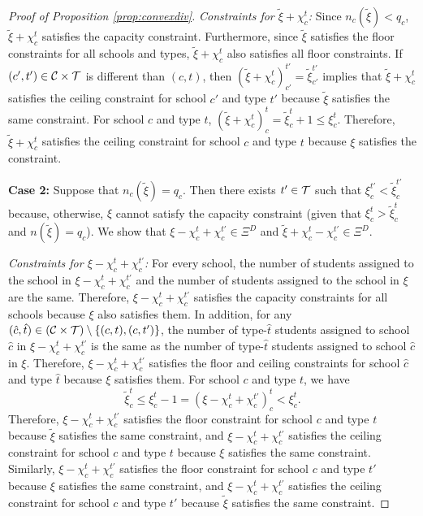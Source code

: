 \documentclass[12pt]{amsart}
\theoremstyle{remark}
\begin{document}
\begin{proof}[Proof of Proposition \ref{prop:convexdiv}]
\smallskip
\noindent \emph{Constraints for $\tilde \xi + \chi_c^t$:} Since $n_c(\tilde \xi) < q_c$, $\tilde \xi + \chi_c^t$ satisfies the capacity constraint.
Furthermore, since $\tilde \xi$ satisfies the floor constraints for all schools and types,  $\tilde \xi + \chi_c^t$ also satisfies all
floor constraints. If $(c',t')\in \mathcal{C} \times \mathcal{T}$ is different than $(c,t)$, then $(\tilde \xi + \chi_c^t)_{c'}^{t'}=\tilde{\xi}_{c'}^{t'}$
implies that $\tilde \xi + \chi_c^t$ satisfies the ceiling constraint for school $c'$ and type $t'$ because $\tilde \xi$ satisfies the same
constraint. For school $c$ and type $t$, $(\tilde \xi + \chi_c^t)_{c}^{t}= \tilde{\xi}_c^t + 1 \leq \xi_c^t$. Therefore, $\tilde \xi + \chi_c^t$
satisfies the ceiling constraint for school $c$ and type $t$ because $\xi$ satisfies the constraint.

\medskip
\textbf{Case 2:} Suppose that $n_c(\tilde \xi) = q_c$. Then there exists $t'\in \mathcal{T}$ such that $\xi_c^{t'} < \tilde{\xi}_{c}^{t'}$ because,
otherwise, $\xi$ cannot satisfy the capacity constraint (given that $\xi_c^t>\tilde{\xi}_{c}^{t}$ and $n(\tilde \xi) = q_c$). We show that
$\xi-\chi_c^t+\chi_{c}^{t'} \in \Xi^D$ and $\tilde{\xi}+\chi_c^t-\chi_{c}^{t'}\in \Xi^D$.

\smallskip
\noindent \emph{Constraints for $\xi-\chi_c^t+\chi_{c}^{t'}$:} For every school, the number of students assigned to the school in $\xi-\chi_c^t+\chi_{c}^{t'}$ and
the number of students assigned to the school in $\xi$ are the same. Therefore, $\xi-\chi_c^t+\chi_{c}^{t'}$ satisfies the capacity constraints for all schools
because $\xi$ also satisfies them. In addition, for any $(\hat c, \hat t) \in (\mathcal{C} \times \mathcal{T}) \setminus \{(c,t),(c,t')\}$, the
number of type-$\hat{t}$ students assigned to school $\hat c$ in $\xi-\chi_c^t+\chi_{c}^{t'}$ is the same as the
number of type-$\hat{t}$ students assigned to school $\hat c$ in $\xi$. Therefore, $\xi-\chi_c^t+\chi_{c}^{t'}$ satisfies the floor
and ceiling constraints for school $\hat c$ and type $\hat t$ because $\xi$ satisfies them. For school $c$ and type $t$, we have
\[\tilde{\xi}^t_c \leq \xi^t_c-1=(\xi-\chi_c^t+\chi_{c}^{t'})_c^t<\xi^t_c.\]
Therefore, $\xi-\chi_c^t+\chi_{c}^{t'}$ satisfies the floor constraint for school $c$ and type $t$ because $\tilde \xi$ satisfies the same constraint, and $\xi-\chi_c^t+\chi_{c}^{t'}$ satisfies the ceiling constraint for school $c$ and type $t$ because $\xi$ satisfies the same constraint. Similarly,  $\xi-\chi_c^t+\chi_{c}^{t'}$ satisfies the floor constraint for school $c$ and type $t'$ because $ \xi$ satisfies the same constraint, and $\xi-\chi_c^t+\chi_{c}^{t'}$ satisfies the ceiling constraint for school $c$ and type $t'$ because $\tilde \xi$ satisfies the same constraint.


\end{proof}
\end{document}
